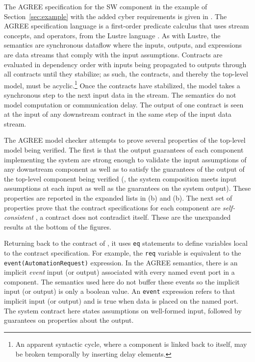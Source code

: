The AGREE specification for the SW component in the example of
Section~\ref{sec:example} with the added cyber requirements is given
in . The AGREE specification language is a first-order
predicate calculus that uses stream concepts, and operators, from the
Lustre language \cite{10.1145/41625.41641}. As with Lustre, the
semantics are synchronous dataflow where the inputs, outputs, and
expressions are data streams that comply with the input
assumptions. Contracts are evaluated in dependency order with inputs
being propagated to outputs through all contracts until they
stabilize; as such, the contracts, and thereby the top-level model,
must be acyclic.\footnote{An apparent syntactic cycle, where a
component is linked back to itself, may be broken temporally by
inserting delay elements.} Once the contracts have stabilized, the
model takes a synchronous step to the next input data in the
stream. The semantics do not model computation or communication
delay. The output of one contract is seen at the input of any
downstream contract in the same step of the input data stream.

The AGREE model checker attempts to prove several properties of the
top-level model being verified. The first is that the output
guarantees of each component implementing the system are strong enough
to validate the input assumptions of any downstream component as well
as to satisfy the guarantees of the output of the top-level component
being verified (\ie, the system composition meets input assumptions
at each input as well as the guarantees on the system output). These
properties are reported in the expanded lists
in (b) and (b).  The next set
of properties prove that the contract specifications for each
component are \emph{self-consistent} \ie, a contract does not contradict
itself. These are the unexpanded results at the bottom of the
figures.

Returning back to the contract of , it uses \texttt{eq}
statements to define variables local to the contract
specification. For example, the \texttt{req} variable is equivalent to
the \texttt{event(AutomationRequest)} expression. In the AGREE
semantics, there is an implicit \emph{event} input (or output)
associated with every named event port in a component. The semantics
used here do not buffer these events so the implicit input (or output)
is only a boolean value. An \texttt{event} expression refers to that
implicit input (or output) and is true when data is placed on the
named port. The system contract here states assumptions on well-formed
input, followed by guarantees on properties about the output.

